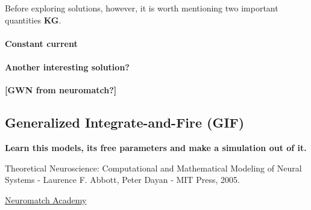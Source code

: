 \documentclass[titlepage]{article}
\begin{document}
Before exploring solutions, however, it is worth mentioning two important quantities \textbf{KG}.

\paragraph{Constant current}

\paragraph{Another interesting solution?}
\textbf{[GWN from neuromatch?]}

\subsection{Generalized Integrate-and-Fire (GIF)}

\textbf{Learn this models, its free parameters and make a simulation out of it.}

\begin{thebibliography}{9}
	
	
	Theoretical Neuroscience: Computational and Mathematical Modeling of Neural Systems - Laurence F. Abbott, Peter Dayan - MIT Press, 2005.
	
	
	\href{https://compneuro.neuromatch.io/tutorials/W2D3_BiologicalNeuronModels/student/W2D3_Tutorial1.html}{Neuromatch Academy}
	
\end{thebibliography}
\end{document}
